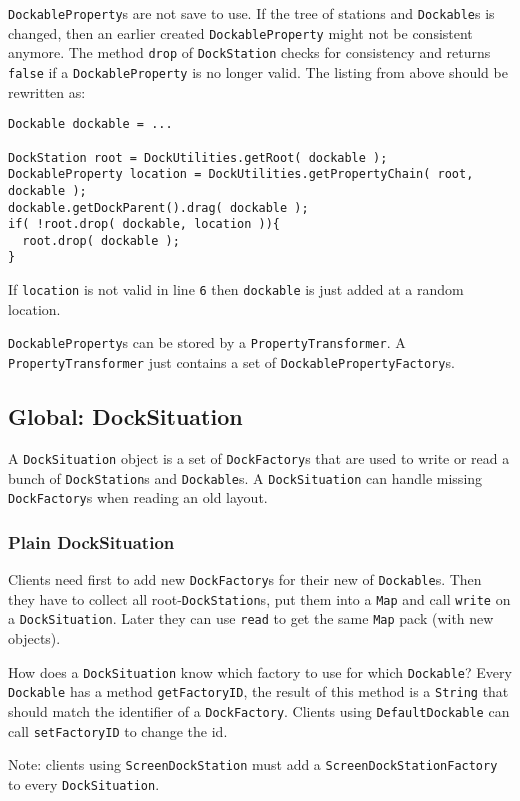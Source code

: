 \documentclass[a4paper,10pt]{article}
\newcommand{\src}[1]{\lstinline[basicstyle=\ttfamily]|#1|}
\begin{document}
\src{DockableProperty}s are not save to use. If the tree of stations and \src{Dockable}s is changed, then an earlier created \src{DockableProperty} might not be consistent anymore. The method \src{drop} of \src{DockStation} checks for consistency and returns \src{false} if a \src{DockableProperty} is no longer valid. The listing from above should be rewritten as:
\begin{lstlisting}
Dockable dockable = ...

DockStation root = DockUtilities.getRoot( dockable );
DockableProperty location = DockUtilities.getPropertyChain( root, dockable );
dockable.getDockParent().drag( dockable );
if( !root.drop( dockable, location )){
  root.drop( dockable );
}
\end{lstlisting}
If \src{location} is not valid in line \src{6} then \src{dockable} is just added at a random location.

\src{DockableProperty}s can be stored by a \src{PropertyTransformer}. A \src{PropertyTransformer} just contains a set of \src{DockablePropertyFactory}s.

\subsection{Global: DockSituation}
A \src{DockSituation} object is a set of \src{DockFactory}s that are used to write or read a bunch of \src{DockStation}s and \src{Dockable}s. A \src{DockSituation} can handle missing \src{DockFactory}s when reading an old layout.

\subsubsection{Plain DockSituation}
Clients need first to add new \src{DockFactory}s for their new of \src{Dockable}s. Then they have to collect all root-\src{DockStation}s, put them into a \src{Map} and call \src{write} on a \src{DockSituation}. Later they can use \src{read} to get the same \src{Map} pack (with new objects).

How does a \src{DockSituation} know which factory to use for which \src{Dockable}? Every \src{Dockable} has a method \src{getFactoryID}, the result of this method is a \src{String} that should match the identifier of a \src{DockFactory}. Clients using \src{DefaultDockable} can call \src{setFactoryID} to change the id.

Note: clients using \src{ScreenDockStation} must add a \src{ScreenDockStationFactory} to every \src{DockSituation}.
\end{document}
